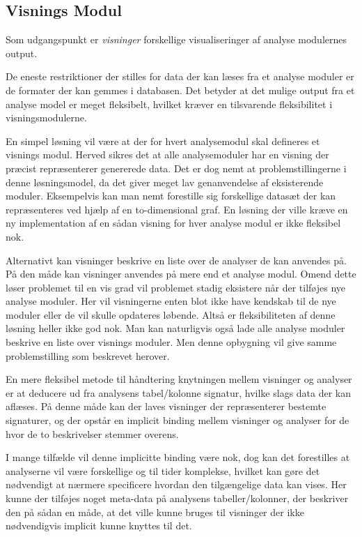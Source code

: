 \subsection{Visnings Modul}

Som udgangspunkt er \textit{visninger} forskellige visualiseringer af analyse modulernes output.

De eneste restriktioner der stilles for data der kan læses fra et analyse moduler er de formater der kan gemmes i databasen.
Det betyder at det mulige output fra et analyse model er meget fleksibelt, hvilket kræver en tilsvarende fleksibilitet i visningsmodulerne.

En simpel løsning vil være at der for hvert analysemodul skal defineres et visnings modul.
Herved sikres det at alle analysemoduler har en visning der præcist repræsenterer genererede data.
Det er dog nemt at problemstillingerne i denne løsningsmodel, da det giver meget lav genanvendelse af eksisterende moduler.
Eksempelvis kan man nemt forestille sig forskellige datasæt der kan repræsenteres ved hjælp af en to-dimensional graf.
En løsning der ville kræve en ny implementation af en sådan visning for hver analyse modul er ikke fleksibel nok.

Alternativt kan visninger beskrive en liste over de analyser de kan anvendes på.
På den måde kan visninger anvendes på mere end et analyse modul.
Omend dette løser problemet til en vis grad vil problemet stadig eksistere når der tilføjes nye analyse moduler.
Her vil visningerne enten blot ikke have kendskab til de nye moduler eller de vil skulle opdateres løbende.
Altså er fleksibiliteten af denne løsning heller ikke god nok.
Man kan naturligvis også lade alle analyse moduler beskrive en liste over visnings moduler.
Men denne opbygning vil give samme problemstilling som beskrevet herover.

En mere fleksibel metode til håndtering knytningen mellem visninger og analyser er at deducere ud fra analysens tabel/kolonne signatur, hvilke slags data der kan aflæses.
På denne måde kan der laves visninger der repræsenterer bestemte signaturer, og der opstår en implicit binding mellem visninger og analyser for de hvor de to beskrivelser stemmer overens.

I mange tilfælde vil denne implicitte binding være nok, dog kan det forestilles at analyserne vil være forskellige og til tider komplekse, hvilket kan gøre det nødvendigt at nærmere specificere hvordan den tilgængelige data kan vises.
Her kunne der tilføjes noget meta-data på analysens tabeller/kolonner, der beskriver den på sådan en måde, at det ville kunne bruges til visninger der ikke nødvendigvis implicit kunne knyttes til det.

